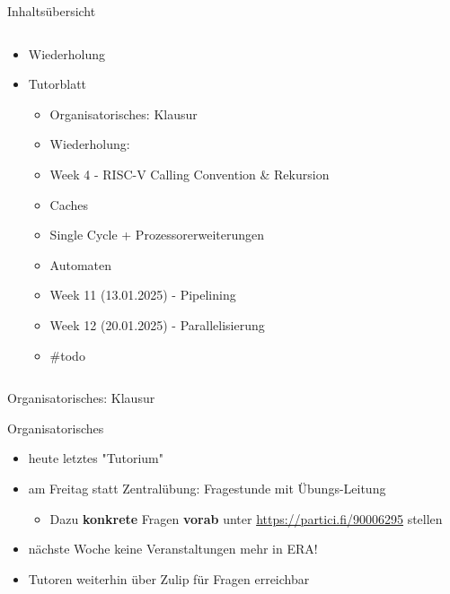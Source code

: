 \documentclass[
  german,            %
  aspectratio=169,    %
]{tumbeamer}
\begin{document}
\begin{frame}[c]{Inhaltsübersicht}{}
  \begin{columns}[c]
    \begin{column}{1\textwidth}
      \begin{itemize}
        \item Wiederholung
        \item Tutorblatt
        \begin{itemize}
			\item Organisatorisches: Klausur
			\item Wiederholung: 
			\item Week 4 - RISC-V Calling Convention \& Rekursion
			\item Caches
			\item Single Cycle + Prozessorerweiterungen
			\item Automaten
			\item Week 11 (13.01.2025) - Pipelining
			\item Week 12 (20.01.2025) - Parallelisierung
			\item \#todo
        \end{itemize}
      \end{itemize}
    \end{column}
  \end{columns}
\end{frame}

\begin{frame}[c]{}{}
	\begin{center}
	  \LARGE Organisatorisches: Klausur
	\end{center}
\end{frame}

\begin{frame}[c]{Organisatorisches}{}
	\begin{itemize}
		\item heute letztes "Tutorium"
		\item am Freitag statt Zentralübung: Fragestunde mit Übungs-Leitung
		\begin{itemize}
			\item Dazu \textbf{konkrete} Fragen \textbf{vorab} unter \href{https://partici.fi/90006295}{https://partici.fi/90006295} stellen
		\end{itemize}
		\item nächste Woche keine Veranstaltungen mehr in ERA!
		\item Tutoren weiterhin über Zulip für Fragen erreichbar
	\end{itemize}
\end{frame}
\end{document}
